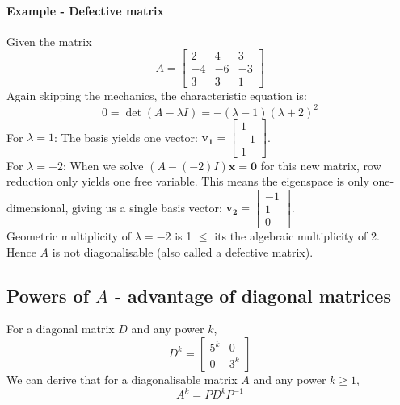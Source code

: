 \documentclass[../linear-algebra.tex]{subfiles}
\begin{document}
\paragraph{Example - Defective matrix} Given the matrix
$$A = \begin{bmatrix} 2 & 4 & 3 \\ -4 & -6 & -3 \\ 3 & 3 & 1 \end{bmatrix}$$
Again skipping the mechanics, the characteristic equation is:
$$0 = \det(A - \lambda I) = -(\lambda - 1)(\lambda + 2)^2$$
For $\lambda = 1$: The basis yields one vector: $\mathbf{v_1} = \begin{bmatrix} 1 \\ -1 \\ 1 \end{bmatrix}$.\\
For $\lambda = -2$: When we solve $(A - (-2)I)\mathbf{x} = \mathbf{0}$ for this new matrix, row reduction only yields one free variable.
This means the eigenspace is only one-dimensional, giving us a single basis vector: $\mathbf{v_2} = \begin{bmatrix} -1 \\ 1 \\ 0 \end{bmatrix}$.\\
Geometric multiplicity of $\lambda = -2$ is 1 $\leq$ its the algebraic multiplicity of 2.\\
Hence $A$ is not diagonalisable (also called a defective matrix).

\subsection{Powers of $A$ - advantage of diagonal matrices}
For a diagonal matrix $D$ and any power $k$,
$$D^k = \begin{bmatrix} 5^k & 0 \\ 0 & 3^k \end{bmatrix}$$
We can derive that for a diagonalisable matrix $A$ and any power $k \geq 1$,
$$A^k = PD^kP^{-1}$$
\end{document}
